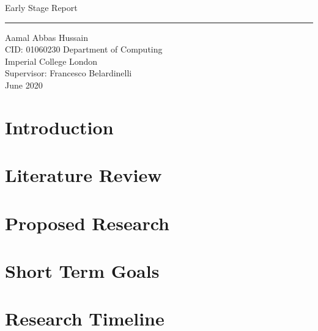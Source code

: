 \documentclass[11pt]{report}
\begin{document}
\clearpage\thispagestyle{empty}
\begin{titlepage}

	\flushright
    \hfill
    \vfill
	{\Huge Early Stage Report \par} 
	\rule[5pt]{\textwidth}{.4pt} \par
	{\Large Aamal Abbas Hussain \\ CID: 01060230}
	\vfill 
    {\Large Department of Computing\\Imperial College London\\Supervisor: Francesco Belardinelli\\
	June 2020 \\}
\end{titlepage}



\tableofcontents

\chapter{Introduction}  \label{ch::Intro}

\chapter{Literature Review}  \label{ch::Lit_Review}

\chapter{Proposed Research}  \label{ch::ProposedResearch}

\chapter{Short Term Goals}  \label{ch::ShortTermGoals}

\chapter{Research Timeline}  \label{ch::ResearchTimeline}
\end{document}
